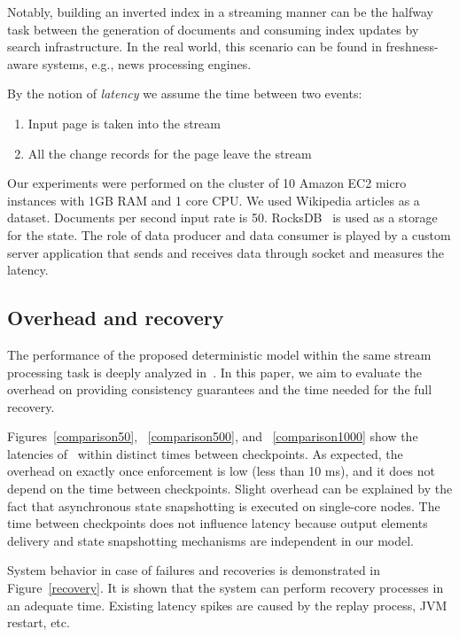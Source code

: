 Notably, building an inverted index in a streaming manner can be the halfway task between the generation of documents and consuming index updates by search infrastructure. In the real world, this scenario can be found in freshness-aware systems, e.g., news processing engines.

By the notion of {\it latency} we assume the time between two events: 

\begin{enumerate}
    \item Input page is taken into the stream
    \item All the change records for the page leave the stream
\end{enumerate}

Our experiments were performed on the cluster of 10 Amazon EC2 micro instances with 1GB RAM and 1 core CPU. We used Wikipedia articles as a dataset. Documents per second input rate is 50. RocksDB~\cite{rocksdb} is used as a storage for the state. The role of data producer and data consumer is played by a custom server application that sends and receives data through socket and measures the latency.

\subsection{Overhead and recovery}
The performance of the proposed deterministic model within the same stream processing task is deeply analyzed in~\cite{we2018seim}. In this paper, we aim to evaluate the overhead on providing consistency guarantees and the time needed for the full recovery.

Figures~\ref{comparison50}, ~\ref{comparison500}, and ~\ref{comparison1000} show   the latencies of \FlameStream\ within distinct times between checkpoints. As expected, the overhead on exactly once enforcement is low (less than 10 ms), and it does not depend on the time between checkpoints. Slight overhead can be explained by the fact that asynchronous state snapshotting is executed on single-core nodes. The time between checkpoints does not influence latency because output elements delivery and state snapshotting mechanisms are independent in our model.

System behavior in case of failures and recoveries is demonstrated in Figure~\ref{recovery}. It is shown that the system can perform recovery processes in an adequate time. Existing latency spikes are caused by the replay process, JVM restart, etc.

